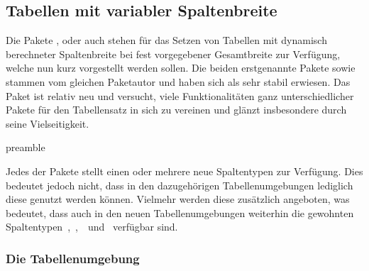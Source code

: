 \documentclass[%
  english,ngerman,%
  cdgeometry=no,DIV=12,%
  cd=false,cdfont=false,cdtitle=true,%
  headings=normal,%
  automark,%
  listof=toc,%
]{tudscrartcl}
\begin{document}
\subsection{Tabellen mit variabler Spaltenbreite}

Die Pakete ,  oder auch  
stehen für das Setzen von Tabellen mit dynamisch berechneter Spaltenbreite bei 
fest vorgegebener Gesamtbreite zur Verfügung, welche nun kurz vorgestellt 
werden sollen. Die beiden erstgenannte Pakete  sowie 
 stammen vom gleichen Paketautor und haben sich als sehr 
stabil erwiesen. Das Paket  ist relativ neu und versucht, viele 
Funktionalitäten ganz unterschiedlicher Pakete für den Tabellensatz in sich zu 
vereinen und glänzt insbesondere durch seine Vielseitigkeit. 
%
\begin{Code}{preamble}
\usepackage{tabularx}
\usepackage{tabulary}
\usepackage{tabu}
\usepackage{longtable}

\end{Code}

Jedes der Pakete stellt einen oder mehrere neue Spaltentypen zur Verfügung. 
Dies bedeutet jedoch nicht, dass in den dazugehörigen Tabellenumgebungen 
lediglich diese genutzt werden können. Vielmehr werden diese zusätzlich 
angeboten, was bedeutet, dass auch in den neuen Tabellenumgebungen weiterhin 
die gewohnten Spaltentypen~,~,~~und~ 
verfügbar sind.



\subsubsection{%
  Die Tabellenumgebung %
  \label{sec:tabularx}%
}
\end{document}
